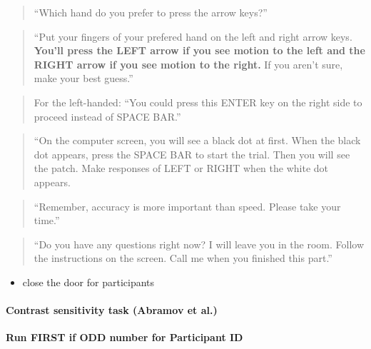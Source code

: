 \documentclass[]{article}
\providecommand{\tightlist}{%
  \setlength{\itemsep}{0pt}\setlength{\parskip}{0pt}}
\let\oldparagraph\paragraph
\renewcommand{\paragraph}[1]{\oldparagraph{#1}\mbox{}}
\begin{document}
\begin{quote}
``Which hand do you prefer to press the arrow keys?''
\end{quote}

\begin{quote}
``Put your fingers of your prefered hand on the left and right arrow
keys. \textbf{You'll press the LEFT arrow if you see motion to the left
and the RIGHT arrow if you see motion to the right.} If you aren't sure,
make your best guess.''
\end{quote}

\begin{quote}
For the left-handed: ``You could press this ENTER key on the right side
to proceed instead of SPACE BAR.''
\end{quote}

\begin{quote}
``On the computer screen, you will see a black dot at first. When the
black dot appears, press the SPACE BAR to start the trial. Then you will
see the patch. Make responses of LEFT or RIGHT when the white dot
appears.
\end{quote}

\begin{quote}
``Remember, accuracy is more important than speed. Please take your
time.''
\end{quote}

\begin{quote}
``Do you have any questions right now? I will leave you in the room.
Follow the instructions on the screen. Call me when you finished this
part.''
\end{quote}

\begin{itemize}
\tightlist
\item
  close the door for participants
\end{itemize}

\paragraph{Contrast sensitivity task (Abramov et
al.)}\label{contrast-sensitivity-task-abramov-et-al.}

\textbf{Run FIRST if ODD number for Participant ID}
\end{document}
